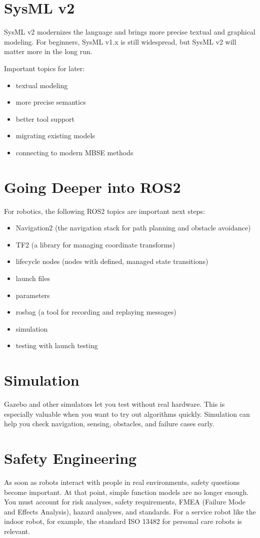 \section{SysML v2}
SysML v2 modernizes the language and brings more precise textual and graphical modeling. For beginners, SysML v1.x is still widespread, but SysML v2 will matter more in the long run.

Important topics for later:

\begin{itemize}
    \item textual modeling
    \item more precise semantics
    \item better tool support
    \item migrating existing models
    \item connecting to modern MBSE methods
\end{itemize}

\section{Going Deeper into ROS2}
For robotics, the following ROS2 topics are important next steps:

\begin{itemize}
    \item Navigation2 (the navigation stack for path planning and obstacle avoidance)
    \item TF2 (a library for managing coordinate transforms)
    \item lifecycle nodes (nodes with defined, managed state transitions)
    \item launch files
    \item parameters
    \item rosbag (a tool for recording and replaying messages)
    \item simulation
    \item testing with launch testing
\end{itemize}

\section{Simulation}
Gazebo and other simulators let you test without real hardware. This is especially valuable when you want to try out algorithms quickly. Simulation can help you check navigation, sensing, obstacles, and failure cases early.

\section{Safety Engineering}
As soon as robots interact with people in real environments, safety questions become important. At that point, simple function models are no longer enough. You must account for risk analyses, safety requirements, FMEA (Failure Mode and Effects Analysis), hazard analyses, and standards. For a service robot like the indoor robot, for example, the standard ISO 13482 for personal care robots is relevant.

